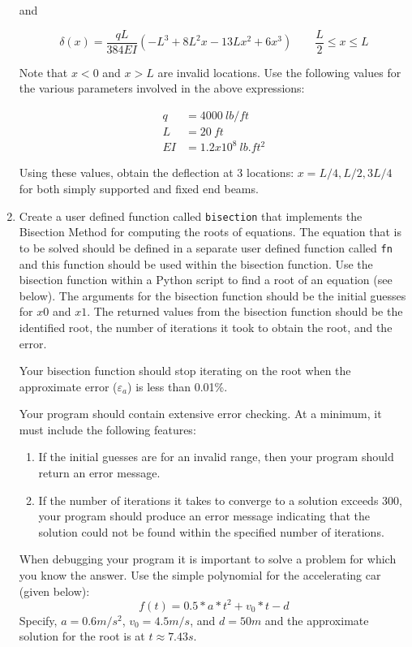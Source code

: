 \documentclass[a4paper,12pt]{article}
\begin{document}
\begin{enumerate}
	and 
	
	\begin{equation*}
	\delta(x) = \frac{q L}{384EI}( -L^3  + 8L^2x - 13Lx^2 + 6x^3) \qquad \frac{L}{2} \le x \le L
	\end{equation*}
	
	Note that $x < 0$ and $x > L$ are invalid locations. Use the following values for the various parameters involved in the above expressions:
	
	\begin{align*}
		q & = 4000 ~lb/ft\\
		L & = 20 ~ft\\
		EI & = 1.2x10^8 ~lb.ft^2
	\end{align*}
	
	Using these values, obtain the deflection at 3 locations: $x = L/4, L/2, 3L/4$ for both simply supported and fixed end beams.
	
	\item Create a user defined function called \verb|bisection| that implements the Bisection Method for computing the roots of equations. The equation that is to be solved should be defined in a separate user defined function called \verb|fn| and this function should be used within the bisection function. Use the bisection function within a Python script to find a root of an equation (see below).
	The arguments for the bisection function should be the initial guesses for $x0$ and $x1$.  The returned values from the bisection function should be the identified root, the number of iterations it took to obtain the root, and the error. 
	
	Your bisection function should stop iterating on the root when the approximate error ($\varepsilon_a$) is less than 0.01\%.

	Your program should contain extensive error checking. At a minimum, it must include the following features:
	\begin{enumerate}
		\item If the initial guesses are for an invalid range, then your program should return an error message.
		\item If the number of iterations it takes to converge to a solution exceeds 300, your program should produce an error message indicating that the solution could not be found within the specified number of iterations.
	\end{enumerate}

	When debugging your program it is important to solve a problem for which you know the answer. Use the simple polynomial for the accelerating car (given below):
	\begin{equation*}
	f(t) = 0.5 * a * t^2 + v_0 * t - d
	\end{equation*}
	Specify, $a = 0.6m/s^2$, $v_0 = 4.5 m/s$, and $d=50m$ and the approximate solution for the root is at $t\approx7.43s$.
	

\end{enumerate}
\end{document}
